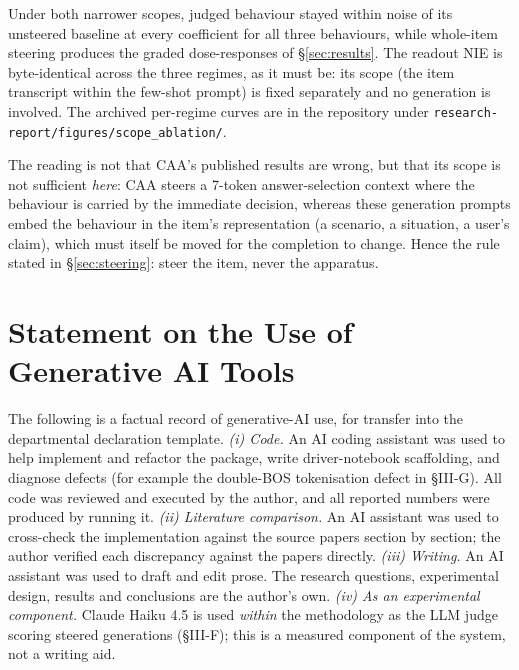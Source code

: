 \documentclass[conference]{IEEEtran}
\begin{document}
Under both narrower scopes, judged behaviour stayed within noise of its unsteered
baseline at every coefficient for all three behaviours, while whole-item steering
produces the graded dose-responses of §\ref{sec:results}. The readout NIE is
byte-identical across the three regimes, as it must be: its scope (the item
transcript within the few-shot prompt) is fixed separately and no generation is
involved. The archived per-regime curves are in the repository under
\texttt{research-report/figures/scope\_ablation/}.

The reading is not that CAA's published results are wrong, but that its scope is
not sufficient \emph{here}: CAA steers a 7-token answer-selection context where
the behaviour is carried by the immediate decision, whereas these generation
prompts embed the behaviour in the item's representation (a scenario, a
situation, a user's claim), which must itself be moved for the completion to
change. Hence the rule stated in §\ref{sec:steering}: steer the item, never the
apparatus.

\section{Statement on the Use of Generative AI Tools}
\label{app:genai}
The following is a factual record of generative-AI use, for transfer into the
departmental declaration template.
\emph{(i) Code.} An AI coding assistant was used to help implement and refactor the package, write
driver-notebook scaffolding, and diagnose defects (for example the double-BOS tokenisation defect in
§III-G). All code was reviewed and executed by the author, and all reported numbers were produced by
running it.
\emph{(ii) Literature comparison.} An AI assistant was used to cross-check the implementation against
the source papers section by section; the author verified each discrepancy against the papers
directly.
\emph{(iii) Writing.} An AI assistant was used to draft and edit prose. The research questions,
experimental design, results and conclusions are the author's own.
\emph{(iv) As an experimental component.} Claude Haiku 4.5 is used \emph{within} the methodology as
the LLM judge scoring steered generations (§III-F); this is a measured component of the system, not a
writing aid.
\end{document}
